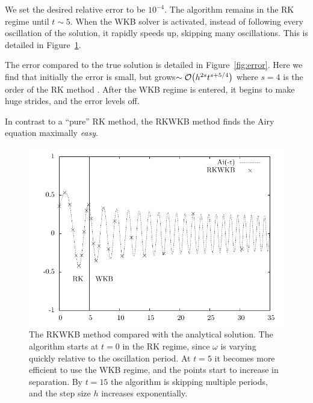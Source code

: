 We set the desired relative error to be \(10^{-4}\). The algorithm remains in the RK regime until \(t\sim5\). When the WKB solver is activated, instead of following every oscillation of the solution, it rapidly speeds up, skipping many oscillations. This is detailed in Figure~\ref{fig:data}.

The error compared to the true solution is detailed in Figure~\ref{fig:error}. Here we find that initially the error is small, but grows\({\sim\mathcal{O}{\left(h^{2s} t^{s+5/4}\right)}}\) where \(s=4\) is the order of the RK method \citep{Iserles02globalerror}. After the WKB regime is entered, it begins to make huge strides, and the error levels off.

In contrast to a ``pure'' RK method, the RKWKB method finds the Airy equation maximally {\em easy}.



\begin{figure}[tp]
  \centering
  \includegraphics[width=\textwidth]{chapters/RKWKB/figures/data}
  \caption{The RKWKB method compared with the analytical solution. The algorithm starts at \(t=0\) in the RK regime, since \(\omega\) is varying quickly relative to the oscillation period. At \(t=5\) it becomes more efficient to use the WKB regime, and the points start to increase in separation. By \(t=15\) the algorithm is skipping multiple periods, and the step size \(h\) increases exponentially.}\label{fig:data}
\end{figure}

